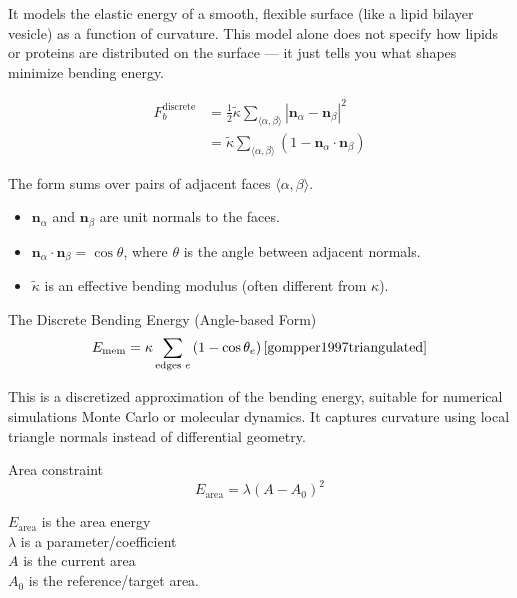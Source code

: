 \documentclass[12pt]{article}
\begin{document}
\begin{flushleft}
It models the elastic energy of a smooth, flexible surface (like a lipid bilayer vesicle) as a function of curvature. This model alone does not specify how lipids or proteins are distributed on the surface — it just tells you what shapes minimize bending energy.






\begin{equation}
\begin{split}
F_b^{\text{discrete}} &= \frac{1}{2} \tilde{\kappa} \sum_{\langle \alpha, \beta \rangle} \left| \mathbf{n}_\alpha - \mathbf{n}_\beta \right|^2 \\
&= \tilde{\kappa} \sum_{\langle \alpha, \beta \rangle} \left( 1 - \mathbf{n}_\alpha \cdot \mathbf{n}_\beta \right) 
\end{split}
\end{equation}







The form sums over pairs of adjacent faces \(\langle \alpha, \beta \rangle\).

\begin{itemize}
    \item \(\mathbf{n}_\alpha\) and \(\mathbf{n}_\beta\) are unit normals to the faces.
    \item \(\mathbf{n}_\alpha \cdot \mathbf{n}_\beta = \cos \theta\), where \(\theta\) is the angle between adjacent normals.
    \item \(\tilde{\kappa}\) is an effective bending modulus (often different from \(\kappa\)).
\end{itemize}


The Discrete Bending Energy (Angle-based Form)
\begin{equation}
E_{\text{mem}} = \kappa \sum_{\text{edges } e} \left(1 - \cos \theta_e \right)\cite{gompper1997triangulated}
\end{equation}

This is a discretized approximation of the bending energy, suitable for numerical simulations Monte Carlo or molecular dynamics. It captures curvature using local triangle normals instead of differential geometry.

Area constraint
\begin{equation}
E_{\text{area}} = \lambda(A - A_0)^2
\end{equation}

$E_{\text{area}}$ is the area energy\\
$\lambda$ is a parameter/coefficient\\
$A$ is the current area\\
$A_0$ is the reference/target area.




\end{flushleft}
\end{document}
